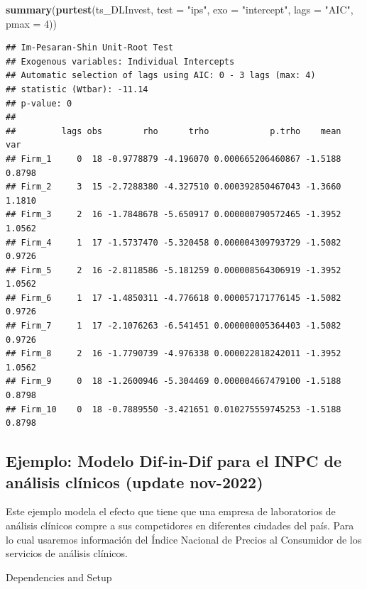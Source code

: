 \documentclass[
]{book}
\newenvironment{Shaded}{\begin{snugshade}}{\end{snugshade}}
\newcommand{\AttributeTok}[1]{\textcolor[rgb]{0.13,0.29,0.53}{#1}}
\newcommand{\DecValTok}[1]{\textcolor[rgb]{0.00,0.00,0.81}{#1}}
\newcommand{\FunctionTok}[1]{\textcolor[rgb]{0.13,0.29,0.53}{\textbf{#1}}}
\newcommand{\NormalTok}[1]{#1}
\newcommand{\StringTok}[1]{\textcolor[rgb]{0.31,0.60,0.02}{#1}}
\begin{document}
\begin{Shaded}
\begin{Highlighting}[]
\FunctionTok{summary}\NormalTok{(}\FunctionTok{purtest}\NormalTok{(ts\_DLInvest, }\AttributeTok{test =} \StringTok{"ips"}\NormalTok{, }\AttributeTok{exo =} \StringTok{"intercept"}\NormalTok{, }
                \AttributeTok{lags =} \StringTok{"AIC"}\NormalTok{, }\AttributeTok{pmax =} \DecValTok{4}\NormalTok{))}
\end{Highlighting}
\end{Shaded}

\begin{verbatim}
## Im-Pesaran-Shin Unit-Root Test 
## Exogenous variables: Individual Intercepts 
## Automatic selection of lags using AIC: 0 - 3 lags (max: 4)
## statistic (Wtbar): -11.14 
## p-value: 0 
## 
##         lags obs        rho      trho            p.trho    mean    var
## Firm_1     0  18 -0.9778879 -4.196070 0.000665206460867 -1.5188 0.8798
## Firm_2     3  15 -2.7288380 -4.327510 0.000392850467043 -1.3660 1.1810
## Firm_3     2  16 -1.7848678 -5.650917 0.000000790572465 -1.3952 1.0562
## Firm_4     1  17 -1.5737470 -5.320458 0.000004309793729 -1.5082 0.9726
## Firm_5     2  16 -2.8118586 -5.181259 0.000008564306919 -1.3952 1.0562
## Firm_6     1  17 -1.4850311 -4.776618 0.000057171776145 -1.5082 0.9726
## Firm_7     1  17 -2.1076263 -6.541451 0.000000005364403 -1.5082 0.9726
## Firm_8     2  16 -1.7790739 -4.976338 0.000022818242011 -1.3952 1.0562
## Firm_9     0  18 -1.2600946 -5.304469 0.000004667479100 -1.5188 0.8798
## Firm_10    0  18 -0.7889550 -3.421651 0.010275559745253 -1.5188 0.8798
\end{verbatim}

\hypertarget{ejemplo-modelo-dif-in-dif-para-el-inpc-de-anuxe1lisis-cluxednicos-update-nov-2022}{%
\subsection{Ejemplo: Modelo Dif-in-Dif para el INPC de análisis clínicos (update nov-2022)}\label{ejemplo-modelo-dif-in-dif-para-el-inpc-de-anuxe1lisis-cluxednicos-update-nov-2022}}

Este ejemplo modela el efecto que tiene que una empresa de laboratorios de análisis clínicos compre a sus competidores en diferentes ciudades del país. Para lo cual usaremos información del Índice Nacional de Precios al Consumidor de los servicios de análisis clínicos.

Dependencies and Setup
\end{document}
